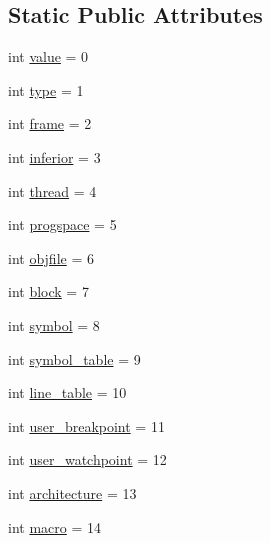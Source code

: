 \subsection*{Static Public Attributes}
\begin{DoxyCompactItemize}
\item 
int \hyperlink{classrunner_1_1communication_1_1Subject_a5915ed27f467b67e5091ac360deca3f0}{value} = 0
\item 
int \hyperlink{classrunner_1_1communication_1_1Subject_afe2029a9dc4876eaa8ccb8d59c65ee03}{type} = 1
\item 
int \hyperlink{classrunner_1_1communication_1_1Subject_a97b4cc6e3172e21385480bcdb8715973}{frame} = 2
\item 
int \hyperlink{classrunner_1_1communication_1_1Subject_a7ffb1cd8221bb1c96fba0e943d39a608}{inferior} = 3
\item 
int \hyperlink{classrunner_1_1communication_1_1Subject_a9135fe15d8c09a20e8d50c992a42a642}{thread} = 4
\item 
int \hyperlink{classrunner_1_1communication_1_1Subject_aeb21e4d206607a3997f69aa1f9b52f9c}{progspace} = 5
\item 
int \hyperlink{classrunner_1_1communication_1_1Subject_af25d538f805497fc2d9604d4e972edd0}{objfile} = 6
\item 
int \hyperlink{classrunner_1_1communication_1_1Subject_a57c8a424411628070935b985340cc7a7}{block} = 7
\item 
int \hyperlink{classrunner_1_1communication_1_1Subject_a708dc59379eed8dcb07fda0bf9c18f50}{symbol} = 8
\item 
int \hyperlink{classrunner_1_1communication_1_1Subject_a69b02a4356abcf2c408db2b8d1e5879d}{symbol\+\_\+table} = 9
\item 
int \hyperlink{classrunner_1_1communication_1_1Subject_a009dfec8f4fe8a2adebe3c8a94ed1730}{line\+\_\+table} = 10
\item 
int \hyperlink{classrunner_1_1communication_1_1Subject_a01c9075135575b142e781b35f3a8fcae}{user\+\_\+breakpoint} = 11
\item 
int \hyperlink{classrunner_1_1communication_1_1Subject_a2009ceb84c36cf4c170fbc71bd2a612f}{user\+\_\+watchpoint} = 12
\item 
int \hyperlink{classrunner_1_1communication_1_1Subject_aea19a5c74958152ffc62b2cfb9566987}{architecture} = 13
\item 
int \hyperlink{classrunner_1_1communication_1_1Subject_a23b2d4b86ba5b310a6566381a25c83d9}{macro} = 14
\end{DoxyCompactItemize}


